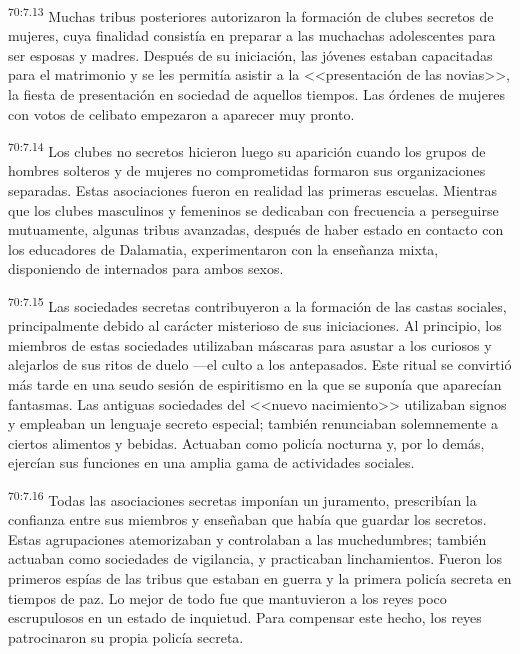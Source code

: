 \documentclass[twoside, 11pt]{book}
\begin{document}
\par
\textsuperscript{70:7.13} Muchas tribus posteriores autorizaron la formación de clubes secretos de mujeres, cuya finalidad consistía en preparar a las muchachas adolescentes para ser esposas y madres. Después de su iniciación, las jóvenes estaban capacitadas para el matrimonio y se les permitía asistir a la <<presentación de las novias>>, la fiesta de presentación en sociedad de aquellos tiempos. Las órdenes de mujeres con votos de celibato empezaron a aparecer muy pronto.

\par
\textsuperscript{70:7.14} Los clubes no secretos hicieron luego su aparición cuando los grupos de hombres solteros y de mujeres no comprometidas formaron sus organizaciones separadas. Estas asociaciones fueron en realidad las primeras escuelas. Mientras que los clubes masculinos y femeninos se dedicaban con frecuencia a perseguirse mutuamente, algunas tribus avanzadas, después de haber estado en contacto con los educadores de Dalamatia, experimentaron con la enseñanza mixta, disponiendo de internados para ambos sexos.

\par
\textsuperscript{70:7.15} Las sociedades secretas contribuyeron a la formación de las castas sociales, principalmente debido al carácter misterioso de sus iniciaciones. Al principio, los miembros de estas sociedades utilizaban máscaras para asustar a los curiosos y alejarlos de sus ritos de duelo ---el culto a los antepasados. Este ritual se convirtió más tarde en una seudo sesión de espiritismo en la que se suponía que aparecían fantasmas. Las antiguas sociedades del <<nuevo nacimiento>> utilizaban signos y empleaban un lenguaje secreto especial; también renunciaban solemnemente a ciertos alimentos y bebidas. Actuaban como policía nocturna y, por lo demás, ejercían sus funciones en una amplia gama de actividades sociales.

\par
\textsuperscript{70:7.16} Todas las asociaciones secretas imponían un juramento, prescribían la confianza entre sus miembros y enseñaban que había que guardar los secretos. Estas agrupaciones atemorizaban y controlaban a las muchedumbres; también actuaban como sociedades de vigilancia, y practicaban linchamientos. Fueron los primeros espías de las tribus que estaban en guerra y la primera policía secreta en tiempos de paz. Lo mejor de todo fue que mantuvieron a los reyes poco escrupulosos en un estado de inquietud. Para compensar este hecho, los reyes patrocinaron su propia policía secreta.
\end{document}
